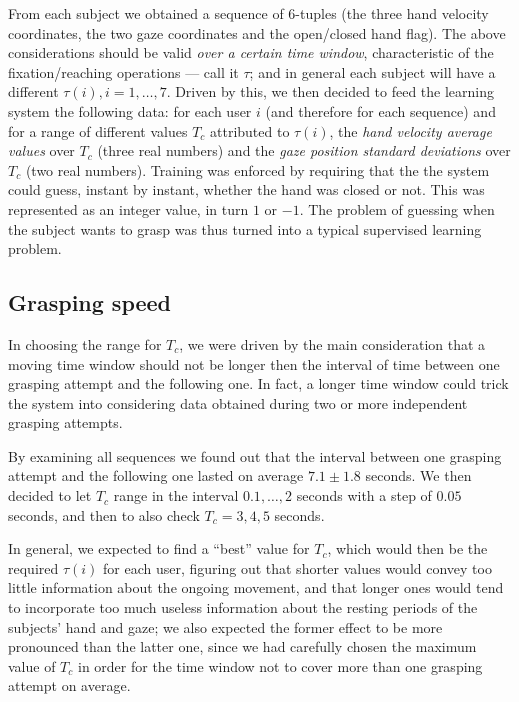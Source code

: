 \documentclass{article}
\begin{document}
From each subject we obtained a sequence of $6$-tuples (the three hand
velocity coordinates, the two gaze coordinates and the open/closed
hand flag). The above considerations should be valid \emph{over a
certain time window}, characteristic of the fixation/reaching
operations --- call it $\tau$; and in general each subject will have a
different $\tau(i), i=1,\ldots,7$. Driven by this, we then decided to
feed the learning system the following data: for each user $i$ (and
therefore for each sequence) and for a range of different values $T_c$
attributed to $\tau(i)$, the \emph{hand velocity average values} over
$T_c$ (three real numbers) and the \emph{gaze position standard
deviations} over $T_c$ (two real numbers). Training was enforced by
requiring that the the system could guess, instant by instant, whether
the hand was closed or not. This was represented as an integer value,
in turn $1$ or $-1$. The problem of guessing when the subject wants to
grasp was thus turned into a typical supervised learning problem.

\subsection{Grasping speed}

In choosing the range for $T_c$, we were driven by the main
consideration that a moving time window should not be longer then the
interval of time between one grasping attempt and the following
one. In fact, a longer time window could trick the system into
considering data obtained during two or more independent grasping
attempts.

By examining all sequences we found out that the interval between one
grasping attempt and the following one lasted on average $7.1 \pm 1.8$
seconds. We then decided to let $T_c$ range in the interval
$0.1,\ldots,2$ seconds with a step of $0.05$ seconds, and then to also
check $T_c=3,4,5$ seconds.

In general, we expected to find a ``best'' value for $T_c$, which
would then be the required $\tau(i)$ for each user, figuring out that
shorter values would convey too little information about the ongoing
movement, and that longer ones would tend to incorporate too much
useless information about the resting periods of the subjects' hand
and gaze; we also expected the former effect to be more pronounced
than the latter one, since we had carefully chosen the maximum value
of $T_c$ in order for the time window not to cover more than one
grasping attempt on average.
\end{document}

